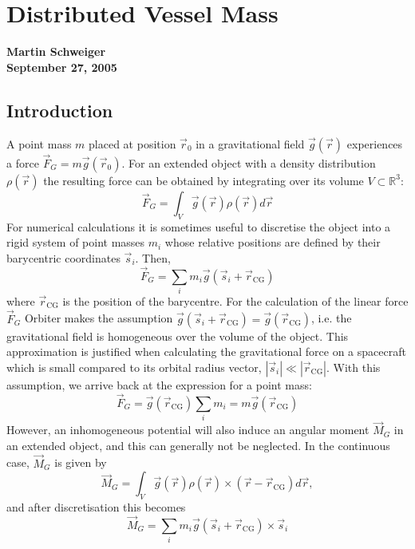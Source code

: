 \documentclass[Orbiter Technical Reference.tex]{subfiles}
\begin{document}
\section{Distributed Vessel Mass}
\textbf{Martin Schweiger}\\
\textbf{September 27, 2005}


\subsection{Introduction}
A point mass $m$ placed at position $\vec{r}_0$ in a gravitational field $\vec{g}(\vec{r})$ experiences a force $\vec{F}_G = m\vec{g}(\vec{r}_0)$.
For an extended object with a density distribution $\rho(\vec{r})$ the resulting force can be obtained by integrating over its volume $V \subset \mathbb{R}^3$:
\begin{equation*}
\vec{F}_G = \int_V \vec{g}(\vec{r})\rho(\vec{r}) d\vec{r}
\end{equation*}
For numerical calculations it is sometimes useful to discretise the object into a rigid system of point masses $m_i$ whose relative positions are defined by their barycentric coordinates $\vec{s}_i$. Then,
\begin{equation*}
\vec{F}_G = \sum_i m_i \vec{g}(\vec{s}_i+\vec{r}_\text{CG})
\end{equation*}
where $\vec{r}_\text{CG}$ is the position of the barycentre. For the calculation of the linear force $\vec{F}_G$ Orbiter makes the assumption $\vec{g}(\vec{s}_i + \vec{r}_\text{CG}) = \vec{g}(\vec{r}_\text{CG})$, i.e. the gravitational field is homogeneous over the volume of the object. This approximation is justified when calculating the gravitational force on a spacecraft which is small compared to its orbital radius vector, $|\vec{s}_i| \ll |\vec{r}_\text{CG}|$. With this assumption, we arrive back at the expression for a point mass:
\begin{equation*}
\vec{F}_G = \vec{g}(\vec{r}_\text{CG}) \sum_i m_i = m \vec{g}(\vec{r}_\text{CG})
\end{equation*}
However, an inhomogeneous potential will also induce an angular moment $\vec{M}_G$ in an extended object, and this can generally not be neglected.
In the continuous case, $\vec{M}_G$ is given by
\begin{equation}\label{eq:cont_torque}
\vec{M}_G = \int_V \vec{g}(\vec{r}) \rho(\vec{r}) \times (\vec{r}-\vec{r}_\text{CG}) d\vec{r},
\end{equation}
and after discretisation this becomes
\begin{equation}\label{eq:torque}
\vec{M}_G = \sum_i m_i \vec{g}(\vec{s}_i + \vec{r}_\text{CG}) \times \vec{s}_i
\end{equation}
\end{document}
